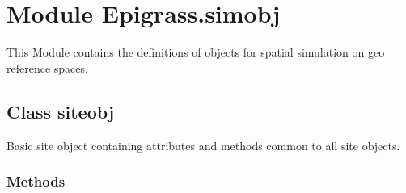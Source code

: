 %
%
%


\section{Module Epigrass.simobj}

    \label{Epigrass:simobj}
This Module contains the definitions of objects for spatial simulation on 
geo reference spaces.



\subsection{Class siteobj}

    \label{Epigrass:simobj:siteobj}
Basic site object containing attributes and methods common to all site 
objects.



  \subsubsection{Methods}

    \label{Epigrass:simobj:siteobj:__init__}

    \vspace{0.5ex}


